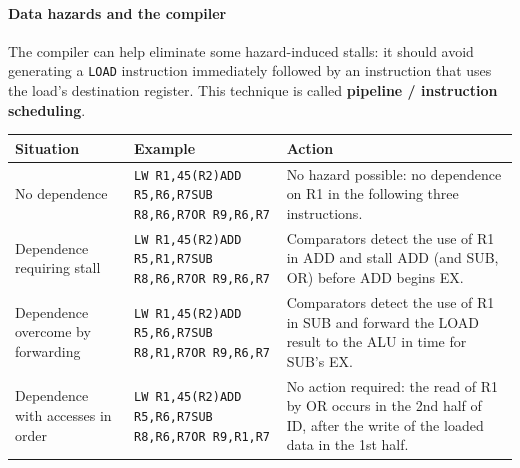 \paragraph{Data hazards and the compiler}

\begin{definition}
The compiler can help eliminate some hazard-induced stalls: it should avoid
generating a \texttt{LOAD} instruction immediately followed by an
instruction that uses the load's destination register. This technique is
called \textbf{pipeline / instruction scheduling}.
\end{definition}

\begin{center}
\begin{tabular}{@{}p{3.4cm}p{4.3cm}p{5.6cm}@{}}
\toprule
Situation & Example & Action \\
\midrule
No dependence &
\texttt{LW R1,45(R2)}\newline\texttt{ADD R5,R6,R7}\newline\texttt{SUB R8,R6,R7}\newline\texttt{OR R9,R6,R7} &
No hazard possible: no dependence on R1 in the following three instructions.\\[4pt]
Dependence requiring stall &
\texttt{LW R1,45(R2)}\newline\texttt{ADD R5,R1,R7}\newline\texttt{SUB R8,R6,R7}\newline\texttt{OR R9,R6,R7} &
Comparators detect the use of R1 in ADD and stall ADD (and SUB, OR) before ADD begins EX.\\[4pt]
Dependence overcome by forwarding &
\texttt{LW R1,45(R2)}\newline\texttt{ADD R5,R6,R7}\newline\texttt{SUB R8,R1,R7}\newline\texttt{OR R9,R6,R7} &
Comparators detect the use of R1 in SUB and forward the LOAD result to the ALU in time for SUB's EX.\\[4pt]
Dependence with accesses in order &
\texttt{LW R1,45(R2)}\newline\texttt{ADD R5,R6,R7}\newline\texttt{SUB R8,R6,R7}\newline\texttt{OR R9,R1,R7} &
No action required: the read of R1 by OR occurs in the 2nd half of ID, after the write of the loaded data in the 1st half.\\
\bottomrule
\end{tabular}
\end{center}

